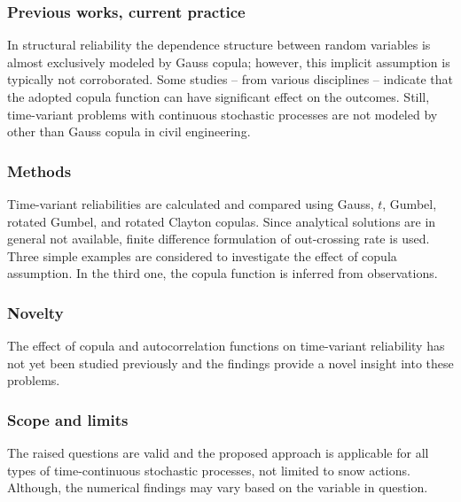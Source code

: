 \subsubsection{Previous works, current practice}
In structural reliability the dependence structure between random variables is almost exclusively modeled by Gauss copula; however, this implicit assumption is typically not corroborated. Some studies -- from various disciplines -- indicate that the adopted copula function can have significant effect on the outcomes. Still, time-variant problems with continuous stochastic processes are not modeled by other than Gauss copula in civil engineering.

\subsubsection{Methods}
Time-variant reliabilities are calculated and compared using Gauss, $t$, Gumbel, rotated Gumbel, and rotated Clayton copulas.
Since analytical solutions are in general not available, finite difference formulation of out-crossing rate is used. Three simple examples are considered to investigate the effect of copula assumption. In the third one, the copula function is inferred from observations.

\subsubsection{Novelty}
The effect of copula and autocorrelation functions on time-variant reliability has not yet been studied previously and the findings provide a novel insight into these problems.

\subsubsection{Scope and limits}
The raised questions are valid and the proposed approach is applicable for all types of time-continuous stochastic processes, not limited to snow actions.
Although, the numerical findings may vary based on the variable in question.
  

